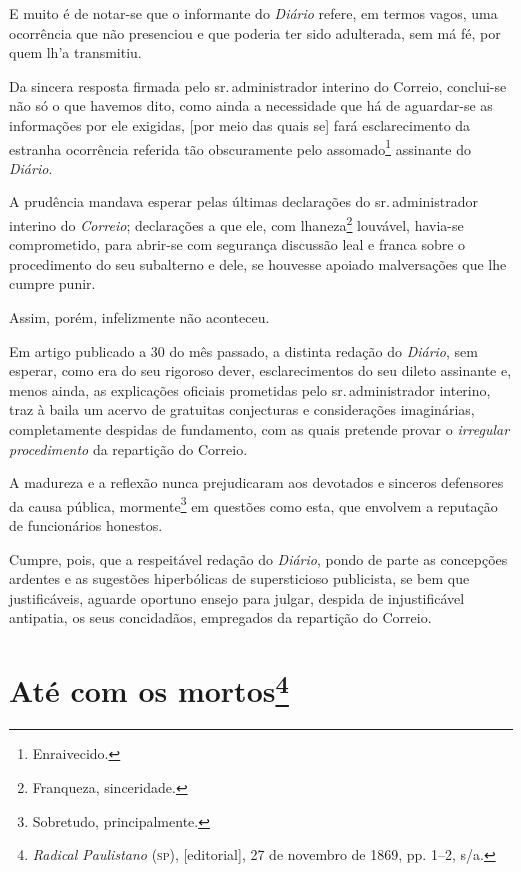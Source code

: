 E muito é de notar-se que o informante do \emph{Diário} refere, em
termos vagos, uma ocorrência que não presenciou e que poderia ter sido
adulterada, sem má fé, por quem lh'a transmitiu.

Da sincera resposta firmada pelo sr.\,administrador interino do Correio,
conclui-se não só o que havemos dito, como ainda a necessidade que há de
aguardar-se as informações por ele exigidas, {[}por meio das quais se{]}
fará esclarecimento da estranha ocorrência referida tão obscuramente
pelo assomado\footnote{Enraivecido.} assinante do \emph{Diário}.

A prudência mandava esperar pelas últimas declarações do sr.\,administrador interino do \emph{Correio}; declarações a que ele, com
lhaneza\footnote{Franqueza, sinceridade.} louvável, havia-se
comprometido, para abrir-se com segurança discussão leal e franca sobre
o procedimento do seu subalterno e dele, se houvesse apoiado
malversações que lhe cumpre punir.

Assim, porém, infelizmente não aconteceu.

Em artigo publicado a 30 do mês passado, a distinta redação do
\emph{Diário}, sem esperar, como era do seu rigoroso dever,
esclarecimentos do seu dileto assinante e, menos ainda, as explicações
oficiais prometidas pelo sr.\,administrador interino, traz à baila um
acervo de gratuitas conjecturas e considerações imaginárias,
completamente despidas de fundamento, com as quais pretende provar o
\emph{irregular procedimento} da repartição do Correio.

A madureza e a reflexão nunca prejudicaram aos devotados e sinceros
defensores da causa pública, mormente\footnote{Sobretudo,
  principalmente.} em questões como esta, que envolvem a reputação de
funcionários honestos.

Cumpre, pois, que a respeitável redação do \emph{Diário}, pondo de parte
as concepções ardentes e as sugestões hiperbólicas de supersticioso
publicista, se bem que justificáveis, aguarde oportuno ensejo para
julgar, despida de injustificável antipatia, os seus concidadãos,
empregados da repartição do Correio.

\chapter{Até com os mortos\footnote{\emph{Radical Paulistano} (\textsc{sp}),
  {[}editorial{]}, 27 de novembro de 1869, pp. 1--2, s/a.}}

